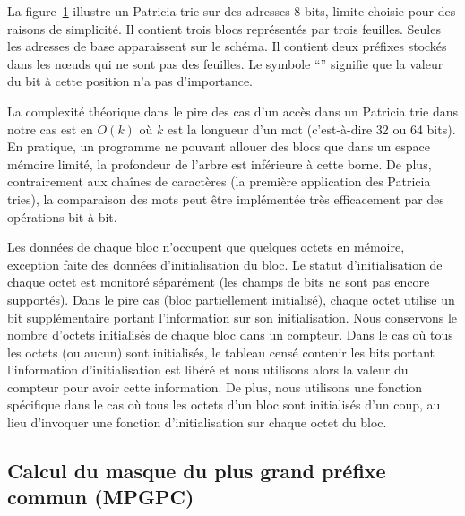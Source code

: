 La figure~\ref{fig:insertion-Patricia-trie-0} illustre un Patricia
trie sur des adresses 8 bits, limite choisie pour des raisons de simplicité.
Il contient trois blocs représentés par trois feuilles.
Seules les adresses de base apparaissent sur le schéma.
Il contient deux préfixes stockés dans les n\oe{}uds qui ne sont pas des
feuilles.
Le symbole ``{\tt *}'' signifie que la valeur du bit à cette position n'a pas
d'importance.

\begin{figure}[h]
  
  \label{fig:insertion-Patricia-trie-0}
\end{figure}

La complexité théorique dans le pire des cas d'un accès dans un Patricia trie
dans notre cas est en $O(k)$ où $k$ est la longueur d'un mot (c'est-à-dire
32 ou 64 bits).
En pratique, un programme ne pouvant allouer des blocs que dans un
espace mémoire limité, la profondeur de l'arbre est inférieure à cette borne.
De plus, contrairement aux chaînes de caractères (la première application des
Patricia tries), la comparaison des mots peut être implémentée très
efficacement par des opérations bit-à-bit.

Les données de chaque bloc n'occupent que quelques octets en mémoire, exception
faite des données d'initialisation du bloc.
Le statut d'initialisation de chaque octet est monitoré séparément (les champs
de bits ne sont pas encore supportés).
Dans le pire cas (bloc partiellement initialisé), chaque octet utilise un bit
supplémentaire portant l'information sur son initialisation.
Nous conservons le nombre d'octets initialisés de chaque bloc dans un
compteur.
Dans le cas où tous les octets (ou aucun) sont initialisés, le tableau censé
contenir les bits portant l'information d'initialisation est libéré et nous
utilisons alors la valeur du compteur pour avoir cette information.
De plus, nous utilisons une fonction spécifique dans le cas où tous les octets
d'un bloc sont initialisés d'un coup, au lieu d'invoquer une fonction
d'initialisation sur chaque octet du bloc.


\subsection{Calcul du masque du plus grand préfixe commun (MPGPC)}
\label{sec:mpgpc}

%

